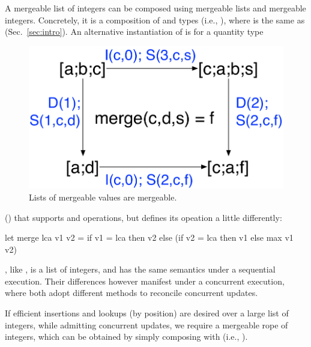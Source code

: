 A mergeable list of integers can be composed using mergeable lists and
mergeable integers.  Concretely, it is a composition of  and
 types (i.e., ), where  is the same
as  (Sec.~\ref{sec:intro}).  An alternative
instantiation of  is for a quantity type
\begin{figure}
  \centering
  \includegraphics[scale=0.4]{Figures/list-eg}
  \caption{Lists of mergeable values are mergeable. }
  \label{fig:list-eg}
\end{figure}
() that supports  and  operations, but
defines its  opeation a little differently:
\begin{ocaml}
let merge lca v1 v2 = if v1 = lca then v2
    else (if v2 = lca then v1 else max v1 v2)
\end{ocaml}
, like , is a list of integers, and has
the same semantics under a sequential execution. Their differences
however manifest under a concurrent execution, where both adopt
different methods to reconcile concurrent updates.

If efficient insertions and lookups (by position) are desired over a
large list of integers, while admitting concurrent updates, we require
a mergeable rope of integers, which can be obtained by simply
composing  with  (i.e., ).


